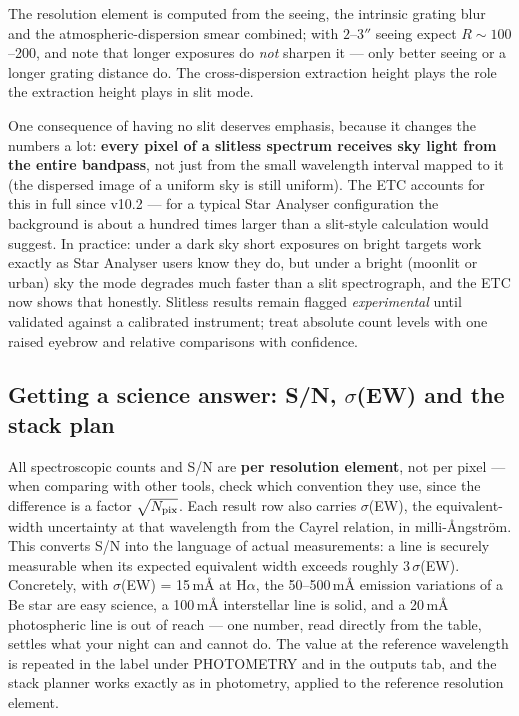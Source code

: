 The resolution element is computed from the seeing, the intrinsic
grating blur and the atmospheric-dispersion smear combined; with
$2$--$3''$ seeing expect $R \sim 100$--200, and note that longer
exposures do \emph{not} sharpen it --- only better seeing or a longer
grating distance do. The cross-dispersion extraction height plays the
role the extraction height plays in slit mode.

One consequence of having no slit deserves emphasis, because it changes
the numbers a lot: \textbf{every pixel of a slitless spectrum receives
sky light from the entire bandpass}, not just from the small wavelength
interval mapped to it (the dispersed image of a uniform sky is still
uniform). The ETC accounts for this in full since v10.2 --- for a
typical Star Analyser configuration the background is about a hundred
times larger than a slit-style calculation would suggest. In practice:
under a dark sky short exposures on bright targets work exactly as Star
Analyser users know they do, but under a bright (moonlit or urban) sky
the mode degrades much faster than a slit spectrograph, and the ETC now
shows that honestly. Slitless results remain flagged
\emph{experimental} until validated against a calibrated instrument;
treat absolute count levels with one raised eyebrow and relative
comparisons with confidence.

\subsection{Getting a science answer: S/N, $\sigma$(EW) and the stack plan}

All spectroscopic counts and S/N are \textbf{per resolution element},
not per pixel --- when comparing with other tools, check which
convention they use, since the difference is a factor $\sqrt{N_{\rm
pix}}$. Each result row also carries $\sigma$(EW), the equivalent-width
uncertainty at that wavelength from the Cayrel relation, in
milli-\AA{}ngstr\"om. This converts S/N into the language of actual
measurements: a line is securely measurable when its expected
equivalent width exceeds roughly $3\,\sigma$(EW). Concretely, with
$\sigma$(EW) = 15\,m\AA{} at H$\alpha$, the 50--500\,m\AA{} emission
variations of a Be star are easy science, a 100\,m\AA{} interstellar
line is solid, and a 20\,m\AA{} photospheric line is out of reach ---
one number, read directly from the table, settles what your night can
and cannot do. The value at the reference wavelength is repeated in the
label under PHOTOMETRY and in the outputs tab, and the stack planner
works exactly as in photometry, applied to the reference resolution
element.
